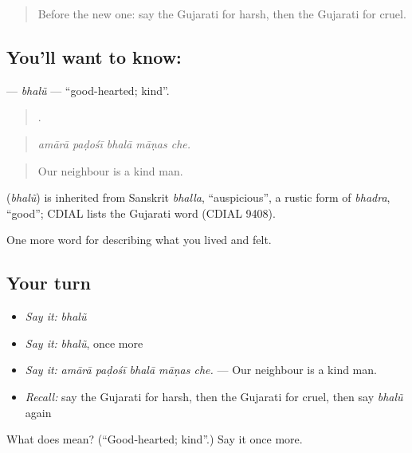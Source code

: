 \begin{quote}
Before the new one: say the Gujarati for harsh, then the Gujarati for cruel.
\end{quote}

\subsection*{You'll want to know: }
\textbf{} — \emph{bhalũ} — \textquotedblleft{}good-hearted; kind\textquotedblright{}.

\begin{quote}
    .
\end{quote}

\begin{quote}
\emph{amārā paḍośī bhalā māṇas che.}
\end{quote}

\begin{quote}
Our neighbour is a kind man.
\end{quote}

\begin{cousinweb}
\textbf{} (\emph{bhalũ}) is inherited from Sanskrit \emph{bhalla}, \textquotedblleft{}auspicious\textquotedblright{}, a rustic form of \emph{bhadra}, \textquotedblleft{}good\textquotedblright{}; CDIAL lists the Gujarati word (CDIAL 9408).
\end{cousinweb}

\begin{grammarlens}[title={What you've built}]
One more word for describing what you lived and felt.
\end{grammarlens}

\subsection*{Your turn}
\begin{itemize}
\raggedright
  \item \emph{Say it:} \emph{bhalũ}
  \item \emph{Say it:} \emph{bhalũ}, once more
  \item \emph{Say it:} \emph{amārā paḍośī bhalā māṇas che.} — Our neighbour is a kind man.
  \item \emph{Recall:} say the Gujarati for harsh, then the Gujarati for cruel, then say \emph{bhalũ} again
\end{itemize}

\begin{tcolorbox}[breakable,colback=teal!4,colframe=teal!35!black,title={Before you move on}]
What does  mean? (\textquotedblleft{}Good-hearted; kind\textquotedblright{}.) Say it once more.
\end{tcolorbox}
